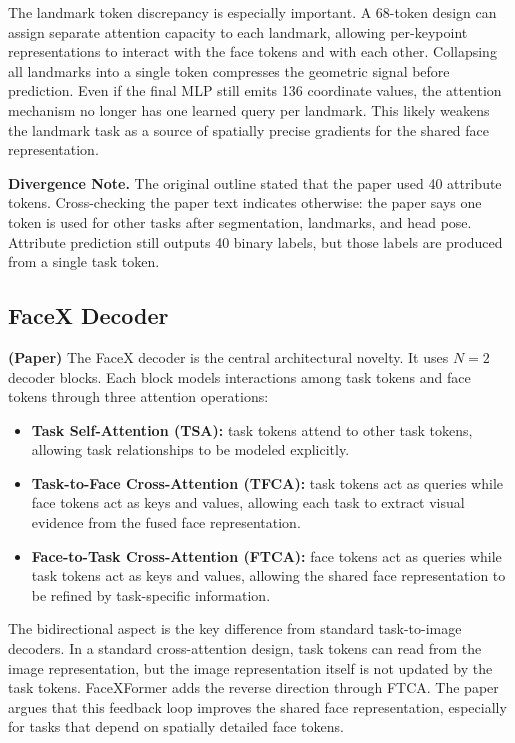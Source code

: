 \documentclass[11pt]{article}
\begin{document}
The landmark token discrepancy is especially important. A 68-token design can assign separate attention capacity to each landmark, allowing per-keypoint representations to interact with the face tokens and with each other. Collapsing all landmarks into a single token compresses the geometric signal before prediction. Even if the final MLP still emits 136 coordinate values, the attention mechanism no longer has one learned query per landmark. This likely weakens the landmark task as a source of spatially precise gradients for the shared face representation.


\textbf{Divergence Note.} The original outline stated that the paper used 40 attribute tokens. Cross-checking the paper text indicates otherwise: the paper says one token is used for other tasks after segmentation, landmarks, and head pose. Attribute prediction still outputs 40 binary labels, but those labels are produced from a single task token.


\subsection{FaceX Decoder}


\textbf{(Paper)} The FaceX decoder is the central architectural novelty. It uses \(N=2\) decoder blocks. Each block models interactions among task tokens and face tokens through three attention operations:


\begin{itemize}[leftmargin=*]
\item \textbf{Task Self-Attention (TSA):} task tokens attend to other task tokens, allowing task relationships to be modeled explicitly.
\item \textbf{Task-to-Face Cross-Attention (TFCA):} task tokens act as queries while face tokens act as keys and values, allowing each task to extract visual evidence from the fused face representation.
\item \textbf{Face-to-Task Cross-Attention (FTCA):} face tokens act as queries while task tokens act as keys and values, allowing the shared face representation to be refined by task-specific information.
\end{itemize}

The bidirectional aspect is the key difference from standard task-to-image decoders. In a standard cross-attention design, task tokens can read from the image representation, but the image representation itself is not updated by the task tokens. FaceXFormer adds the reverse direction through FTCA. The paper argues that this feedback loop improves the shared face representation, especially for tasks that depend on spatially detailed face tokens.
\end{document}
